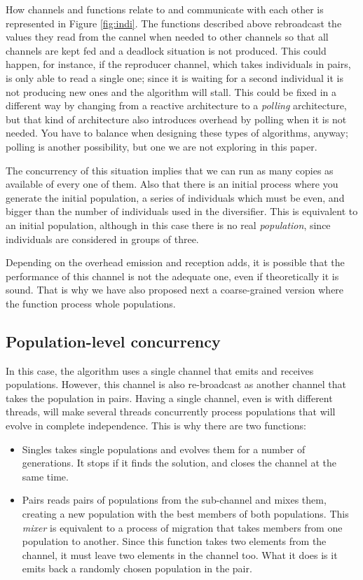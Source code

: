 \documentclass[sigconf]{acmart}
\begin{document}
How channels and functions relate to and communicate with each other is represented in Figure \ref{fig:indi}.  The functions described above rebroadcast the values they read from the cannel when needed to other channels so that all
channels are kept fed and a deadlock situation is not produced. This
could happen, for instance, if the {\sf reproducer channel}, which
takes individuals in pairs, is only able to read a single one; since it is waiting for
a second individual it is not producing new ones and the algorithm
will stall. This could be fixed in a different way by changing from a reactive architecture to a {\em polling} architecture, but that kind of architecture also introduces overhead by polling when it is not needed. You have to balance when designing these types of algorithms, anyway; polling is another possibility, but one we are not exploring in this paper. 

The concurrency of this situation implies that we can run as many
copies as available of every one of them. Also that there is an
initial process where you generate the initial population, a series of
individuals which must be even, and bigger than the number of
individuals used in the diversifier. This is equivalent to an initial
population, although in this case there is no real {\em population},
since individuals are considered in groups of three. 

Depending on the overhead emission and reception adds, it is possible
that the performance of this channel is not the adequate one, even if
theoretically it is sound. That is why we have also proposed next a
coarse-grained version where the function process whole populations.

\subsection{Population-level concurrency}

In this case, the algorithm uses a single channel that emits and receives
populations. However, this channel is also re-broadcast as another channel
that takes the population in pairs. Having a single channel, even is with
different threads, will make several threads concurrently process
populations that will evolve in complete independence. This is why
there are two functions: \begin{itemize}
\item {\sf Singles} takes single populations and evolves them for a
  number of generations. It stops if it finds the solution, and closes
  the channel at the same time.
\item {\sf Pairs} reads pairs of populations from the sub-channel and
  mixes them, creating a new population with the best members of both
  populations. This {\em mixer} is equivalent to a process of
  migration that takes members from one population to another. Since
  this function takes two elements from the channel, it must leave two
  elements in the channel too. What it does is it emits back a
  randomly chosen population in the pair. 
\end{itemize}
\end{document}
